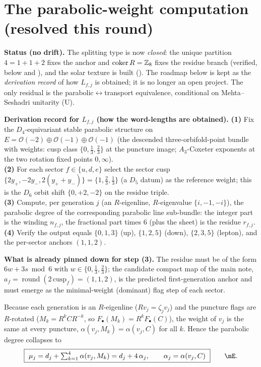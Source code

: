 \section{The parabolic-weight computation (resolved this round)}
\noindent\textbf{Status (no drift).} The splitting type is now \emph{closed}: the unique partition
$4{=}1{+}1{+}2$ fixes the anchor and $\operatorname{coker}R=\mathbb{Z}_8$ fixes the residue branch (verified, below
and ), and the solar texture is built (). The
roadmap below is kept as the \emph{derivation record} of how $L_{f,j}$ is obtained; it is no longer an open
project. The only residual is the parabolic$\leftrightarrow$transport equivalence, conditional on
Mehta--Seshadri unitarity (U).
\par\smallskip\noindent\textbf{Derivation record for $L_{f,j}$ (how the word-lengths are obtained).}
\textbf{(1)} Fix the $D_4$-equivariant stable parabolic structure on
$E=\mathcal O(-2)\oplus\mathcal O(-1)\oplus\mathcal O(-1)$ (the descended three-orbifold-point bundle
with weights: cusp class $\{0,\tfrac13,\tfrac23\}$ at the puncture image; $A_3$-Coxeter exponents at the
two rotation fixed points $0,\infty$).\\
\textbf{(2)} For each sector $f\in\{u,d,e\}$ select the sector cusp
$\{2y_+,-2y_-,2(y_++y_-)\}=\{1,\tfrac23,\tfrac13\}$ (a $D_5$ datum) as the reference weight; this is the
$D_6$ orbit shift $\{0,+2,-2\}$ on the residue triple.\\
\textbf{(3)} Compute, per generation $j$ (an $R$-eigenline, $R$-eigenvalue $\{i,-1,-i\}$), the parabolic
degree of the corresponding parabolic line sub-bundle: the integer part is the winding $n_{f,j}$, the
fractional part times $6$ (plus the sheet) is the residue $r_{f,j}$.\\
\textbf{(4)} Verify the output equals
$\{0,1,3\}$ (up), $\{1,2,5\}$ (down), $\{2,3,5\}$ (lepton), and the per-sector anchors $(1,1,2)$.
\par\smallskip

\noindent\textbf{What is already pinned down for step (3).} The residue must be of the form
$6w+3s\bmod 6$ with $w\in\{0,\tfrac13,\tfrac23\}$; the candidate compact map of the main note,
$a_f=\operatorname{round}(2\,\mathrm{cusp}_f)=(1,1,2)$, is the predicted first-generation anchor and must
emerge as the minimal-weight (dominant) flag step of each sector.

\begin{proposition}
Because each generation is an $R$-eigenline ($Rv_j=\zeta_j v_j$) and the puncture flags are $R$-rotated
($M_k=R^kCR^{-k}$, so $F_\bullet(M_k)=R^kF_\bullet(C)$), the weight of $v_j$ is the same at every
puncture, $\alpha(v_j,M_k)=\alpha(v_j,C)$ for all $k$. Hence the parabolic degree collapses to
\begin{equation}
  \boxed{\ \mu_j=d_j+\textstyle\sum_{k=1}^4\alpha(v_j,M_k)=d_j+4\,\alpha_j,\qquad \alpha_j=\alpha(v_j,C)\ }\qquad\mE .
\end{equation}
\end{proposition}

